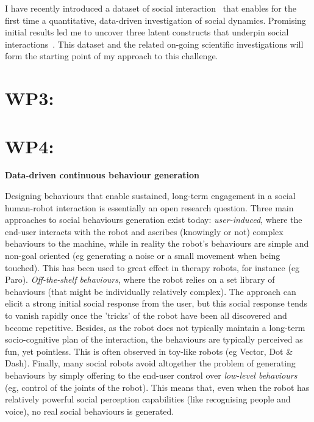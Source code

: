 \documentclass[11pt,a4paper]{report}
\begin{document}
I have recently introduced a dataset of social
interaction~\cite{lemaignan2018pinsoro} that enables for the first time a
quantitative, data-driven investigation of social dynamics. Promising initial
results led me to uncover three latent constructs that underpin social
interactions~\cite{bartlett2019what}. This dataset and the related on-going
scientific investigations will form the starting point of my approach to this
challenge.




\section{WP3: \wpThree{}}

\section{WP4: \wpFour{}}

\textbf{Data-driven continuous behaviour generation}

Designing behaviours that
enable sustained, long-term engagement in a social human-robot interaction is
essentially an open research question. Three main approaches to social
behaviours generation exist today: \emph{user-induced}, where the end-user
interacts with the robot and ascribes (knowingly or not) complex behaviours to
the machine, while in reality the robot's behaviours are simple and non-goal
oriented (eg generating a noise or a small movement when being touched). This
has been used to great effect in therapy robots, for instance (eg Paro).
\emph{Off-the-shelf behaviours}, where the robot relies on a set library of
behaviours (that might be individually relatively complex). The approach can
elicit a strong initial social response from the user, but this social response
tends to vanish rapidly once the 'tricks' of the robot have been all discovered
and become repetitive.  Besides, as the robot does not typically maintain a
long-term socio-cognitive plan of the interaction, the behaviours are typically
perceived as fun, yet pointless. This is often observed in toy-like robots (eg
Vector, Dot \& Dash). Finally, many social robots avoid altogether the problem
of generating behaviours by simply offering to the end-user control over
\emph{low-level behaviours} (eg, control of the joints of the robot). This means
that, even when the robot has relatively powerful social perception capabilities
(like recognising people and voice), no real social behaviours is generated.
\end{document}
